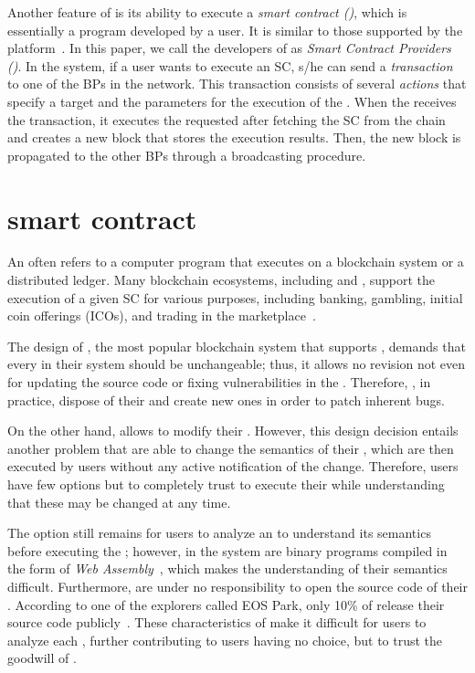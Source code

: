 Another feature of \eos is its ability to execute a \textit{smart contract
(\SC)}, which is essentially a program developed by a user. It is similar to
those supported by the \eth platform~\cite{wood2014ethereum}. In this paper,
we call the developers of \SCs as \textit{Smart Contract Providers (\SCPs)}.
%
In the \eos system, if a user wants to execute an SC, s/he can send a
\textit{transaction} to one of the BPs in the \eos network.
%
This transaction consists of several \textit{actions} that specify a target
\SC and the parameters for the execution of the \SC.
%
When the \BP receives the transaction, it executes the requested \SC after
fetching the SC from the \eos chain and creates a new \eos block that stores
the execution results. Then, the new block is propagated to the other BPs
through a broadcasting procedure.



\section{\eos smart contract}
\label{ss:contract}
An \SC often refers to a computer program that executes on a blockchain system
or a distributed ledger. Many blockchain ecosystems, including \eth and \eos,
support the execution of a given SC for various purposes, including banking,
gambling, initial coin offerings (ICOs), and trading in the marketplace~\cite{
dappradar}.

The design of \eth, the most popular blockchain system that supports \SCs,
demands that every \SC in their system should be unchangeable; thus, it allows
no revision not even for updating the source code or fixing vulnerabilities in
the \SCs. Therefore, \SCPs, in practice, dispose of their \SCs and create new
ones in order to patch inherent bugs.

On the other hand, \eos allows \SCPs to modify their \SCs. However, this design
decision entails another problem that \SCPs are able to change the semantics of
their \SCs, which are then executed by users without any active notification of
the change.
%
Therefore, users have few options but to completely trust \SCPs to execute their
\SCs while understanding that these \SCs may be changed at any time.

The option still remains for users to analyze an \SC to understand its semantics
before executing the \SC; however, \SCs in the \eos system are binary programs
compiled in the form of \textit{Web Assembly}~\cite{bastien2015webassembly},
which makes the understanding of their semantics difficult.
%
Furthermore, \SCPs are under no responsibility to open the source code of
their \SCs. According to one of the \eos explorers called EOS Park, only
10\% of \SCPs release their source code publicly~\cite{eospark}.
%
These characteristics of \eos make it difficult for users to analyze each \SC,
further contributing to users having no choice, but to trust the goodwill of \SCPs.



